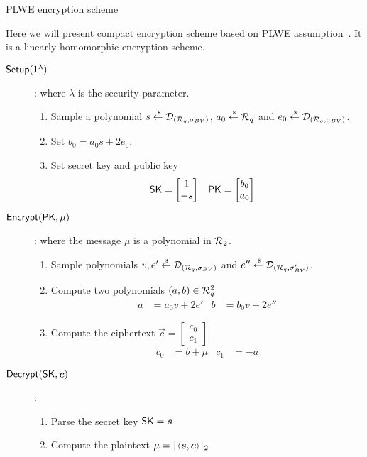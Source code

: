 \begin{subsection}{PLWE encryption scheme~\cite{DBLP:conf/eurocrypt/LyubashevskyPR13}}

  Here we will present compact encryption scheme based on PLWE assumption~\cite{DBLP:conf/eurocrypt/LyubashevskyPR13}.
  It is a linearly homomorphic encryption scheme.
  
  \begin{description}
  \item[${\mathsf{Setup}}(1^\lambda)$]: where $\lambda$ is the security parameter.
    \begin{enumerate}
    \item Sample a polynomial $s \stackrel{{\scriptscriptstyle \mkern4mu \$}}{\gets} \mathcal{D}_{({\mathcal{R}}_q, \sigma_{BV})}$, $a_0 \stackrel{{\scriptscriptstyle \mkern4mu \$}}{\gets} {\mathcal{R}}_q$ and $e_0 \stackrel{{\scriptscriptstyle \mkern4mu \$}}{\gets} \mathcal{D}_{({\mathcal{R}}_q, \sigma_{BV})}$.
    \item Set $b_0 = a_0 s + 2 e_0$.
    \item Set secret key and public key
      \begin{align*}
        \mathsf{SK} &= \begin{bmatrix} 1 \\ -s\end{bmatrix} & \mathsf{PK} &= \begin{bmatrix} b_0 \\ a_0\end{bmatrix}
      \end{align*}
    \end{enumerate}
  \item[${\mathsf{Encrypt}}(\mathsf{PK}, \mu)$]: where the message $\mu$ is a polynomial in ${\mathcal{R}}_2$.
    \begin{enumerate}
    \item Sample polynomials $v,e' \stackrel{{\scriptscriptstyle \mkern4mu \$}}{\gets} \mathcal{D}_{({\mathcal{R}}_q, \sigma_{BV})}$ and $e'' \stackrel{{\scriptscriptstyle \mkern4mu \$}}{\gets}  \mathcal{D}_{({\mathcal{R}}_q, \sigma_{BV}')}$.
    \item Compute two polynomials $(a, b) \in {\mathcal{R}}_q^2$
      \begin{align*}
        a &= a_0 v + 2 e' & b &= b_0 v +2 e'' 
      \end{align*}
    \item Compute the ciphertext $\vec{c} = \begin{bmatrix} c_0 \\ c_1\end{bmatrix}$
      \begin{align*}
        c_0 &= b + \mu & c_1 &= -a
      \end{align*}
    \end{enumerate}
  \item[$\Dec(\SK, \vec{c})$]:
    \begin{enumerate}
    \item Parse the secret key $\SK = \vec{s}$
    \item Compute the plaintext $\mu = \round{\langle \vec{s}, \vec{c}\rangle}_2$
    \end{enumerate}
  \end{description}
\end{subsection}



